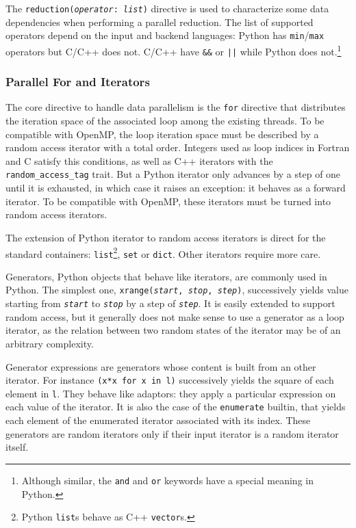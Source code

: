 \documentclass{llncs}
\begin{document}
The \texttt{reduction(\emph{operator}: \emph{list})} directive is used to
characterize some data dependencies when performing a parallel reduction. The
list of supported operators depend on the input and backend languages: Python
has \texttt{min}/\texttt{max} operators but C/C++ does not. C/C++ have
\texttt{\&\&} or \texttt{||} while Python does not.\footnote{Although similar,
the \texttt{and} and \texttt{or} keywords have a special meaning in Python.}

\subsubsection{Parallel For and Iterators}

The core directive to handle data parallelism is the \texttt{for} directive that
distributes the iteration space of the associated loop among the existing
threads. To be compatible with OpenMP, the loop iteration space must be
described by a random access iterator with a total order. Integers used as loop
indices in Fortran and C satisfy this conditions, as well as C++ iterators with
the \texttt{random\_access\_tag} trait. But a Python iterator only advances by a
step of one until it is exhausted, in which case it raises an exception: it
behaves as a forward iterator. To be compatible with OpenMP, these iterators
must be turned into random access iterators.

The extension of Python iterator to random access iterators is direct for the
standard containers: \texttt{list}\footnote{Python \texttt{list}s behave as C++
\texttt{vector}s.}, \texttt{set} or \texttt{dict}. Other iterators require more
care.

Generators, Python objects that behave like iterators, are commonly used in
Python. The simplest one, \texttt{xrange(\emph{start}, \emph{stop},
\emph{step})}, successively yields value starting from \texttt{\emph{start}} to
\texttt{\emph{stop}} by a step of \texttt{\emph{step}}. It is easily extended to
support random access, but it generally does not make sense to use a generator
as a loop iterator, as the relation between two random states of the iterator
may be of an arbitrary complexity.

Generator expressions are generators whose content is built from an other
iterator. For instance \texttt{(x*x for x in l)} successively yields the square
of each element in \texttt{l}. They behave like adaptors: they apply a
particular expression on each value of the iterator. It is also the case of the
\texttt{enumerate} builtin, that yields each element of the enumerated iterator
associated with its index. These generators are random iterators only if their
input iterator is a random iterator itself.
\end{document}
